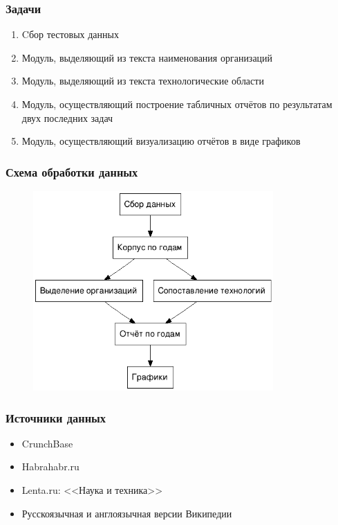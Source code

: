 \documentclass{beamer}
\begin{document}
\begin{frame}\frametitle{Задачи}

\begin{enumerate}
    \item Cбор тестовых данных
    \item Модуль, выделяющий из текста наименования организаций
    \item Модуль, выделяющий из текста технологические области
    \item Модуль, осуществляющий построение табличных отчётов по результатам двух последних задач
    \item Модуль, осуществляющий визуализацию отчётов в виде графиков
\end{enumerate}
\end{frame}

\begin{frame}\frametitle{Схема обработки данных}
\begin{figure}[ht]
\begin{center}
\includegraphics[height=3in]{pipeline.png}
\end{center}
\end{figure}
\end{frame}

\begin{frame}\frametitle{Источники данных}

\begin{itemize}
    \item CrunchBase
    \item Habrahabr.ru
    \item Lenta.ru: <<Наука и техника>>
    \item Русскоязычная и англоязычная версии Википедии
\end{itemize}

\end{frame}
\end{document}
